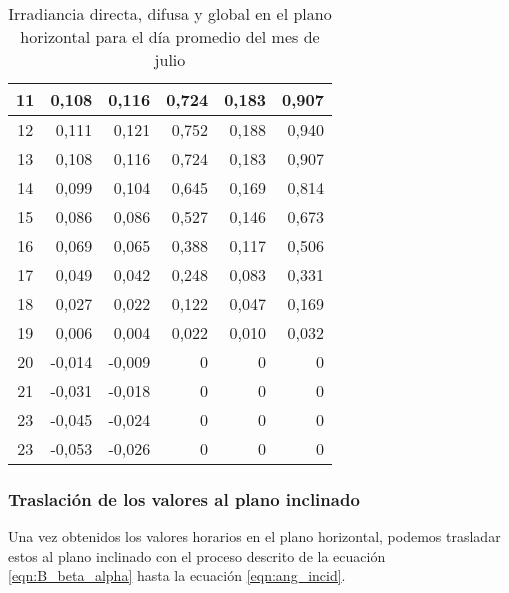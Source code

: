 \begin{table}[H]
\begin{tabular}{|c|r|r|r|r|r|}
11 & 0,108  & 0,116  & 0,724 & 0,183 & 0,907 \\ \hline
12 & 0,111  & 0,121  & 0,752 & 0,188 & 0,940 \\ \hline
13 & 0,108  & 0,116  & 0,724 & 0,183 & 0,907 \\ \hline
14 & 0,099  & 0,104  & 0,645 & 0,169 & 0,814 \\ \hline
15 & 0,086  & 0,086  & 0,527 & 0,146 & 0,673 \\ \hline
16 & 0,069  & 0,065  & 0,388 & 0,117 & 0,506 \\ \hline
17 & 0,049  & 0,042  & 0,248 & 0,083 & 0,331 \\ \hline
18 & 0,027  & 0,022  & 0,122 & 0,047 & 0,169 \\ \hline
19 & 0,006  & 0,004  & 0,022 & 0,010 & 0,032 \\ \hline
20 & -0,014 & -0,009 & 0     & 0     & 0     \\ \hline
21 & -0,031 & -0,018 & 0     & 0     & 0     \\ \hline
23 & -0,045 & -0,024 & 0     & 0     & 0     \\ \hline
23 & -0,053 & -0,026 & 0     & 0     & 0     \\ \hline
\end{tabular}
\caption{Irradiancia directa, difusa y global en el plano horizontal para el día promedio del mes de julio \label{tab:hourly_horizontal_values}}
\end{table}

\subsubsection{Traslación de los valores al plano inclinado}

Una vez obtenidos los valores horarios en el plano horizontal, podemos trasladar estos al plano inclinado con el proceso descrito de la ecuación \ref{eqn:B_beta_alpha} hasta la ecuación \ref{eqn:ang_incid}.

